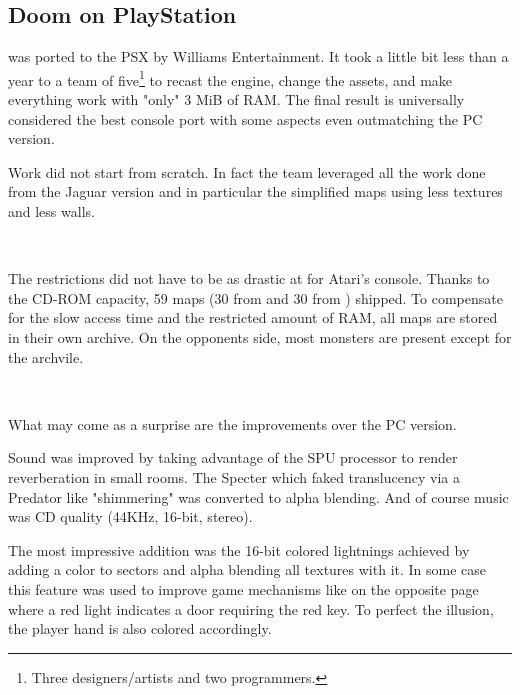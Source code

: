 \subsection{Doom on PlayStation}
\doom{} was ported to the PSX by Williams Entertainment. It took a little bit less than a year to a team of five\footnote{Three designers/artists and two programmers.} to recast the engine, change the assets, and make everything work with "only" 3 MiB of RAM. The final result is universally considered the best console port with some aspects even outmatching the PC version.\\
\par
Work did not start from scratch. In fact the team leveraged all the work done from the Jaguar version and in particular the simplified maps using less textures and less walls.\\
\par
{}\\
\par
  The restrictions did not have to be as drastic at for Atari's console. Thanks to the CD-ROM capacity, 59 maps (30 from \doom{} and 30 from \doomii{}) shipped. To compensate for the slow access time and the restricted amount of RAM, all maps are stored in their own  archive. On the opponents side, most monsters are present except for the archvile.\\
\par
{}\\
\par
What may come as a surprise are the improvements over the PC version.\\
\par
Sound was improved by taking advantage of the SPU processor to render reverberation in small rooms. The Specter which faked translucency via a Predator like  "shimmering" was converted to alpha blending. And of course music was CD quality (44KHz, 16-bit, stereo).\\
\par
 The most impressive addition was the 16-bit colored lightnings achieved by adding a color to sectors and alpha blending all textures with it. In some case this feature was used to improve game mechanisms like on the opposite page where a red light indicates a door requiring the red key. To perfect the illusion, the player hand is also colored accordingly.\\
\par


